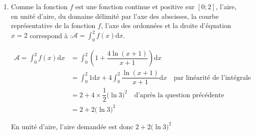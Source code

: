 \documentclass[10pt]{article}
\renewcommand{\d}{{\mathrm{d}}}
\providecommand{\ds}{\displaystyle}
\begin{document}
\begin{enumerate}
\begin{enumerate}
			\item Comme la fonction $f$ est une fonction continue et positive sur $[0 ; 2]$, l'aire, en unité d'aire, du domaine délimité par l'axe des abscisses, la courbe représentative de la fonction $f$, l'axe des ordonnées et la droite d'équation \quad $x=2$ correspond à :\quad $\ds \mathcal{A} = \int_{0}^{2} f(x) \d x$.

			$\begin{aligned}
				\ds \mathcal{A} = \int_{0}^{2} f(x) \d x
					& = \int_{0}^{2} \left(1 + \dfrac{4\ln(x+1)}{x+1}\right) \d x\\
					& = \int_{0}^{2} 1\d x + 4 \int_{0}^{2} \dfrac{\ln(x+1)}{x+1} \d x \quad \text{par linéarité de l'intégrale}\\
					& = 2 + 4 \times \dfrac{1}{2}\big(\ln 3\big)^{2} \quad \text{d'après la question précédente}\\
					& = 2 + 2\big(\ln 3\big)^{2}
			\end{aligned}$

			En unité d'aire, l'aire demandée est donc $2 + 2\big(\ln 3\big)^{2}$
		\end{enumerate}
	\end{enumerate}
\end{document}
